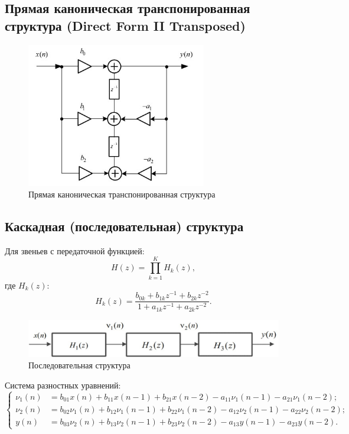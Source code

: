 \documentclass[a4paper, 14pt]{extarticle}
\begin{document}
\subsection{Прямая каноническая транспонированная структура (Direct Form II Transposed)}
\begin{figure}[h]
    \centering
    \includegraphics[width=0.7\textwidth]{img/S006.jpg}
    \caption{Прямая каноническая транспонированная структура}%
    \label{img:df2t}
\end{figure}
\FloatBarrier{}

\subsection{Каскадная (последовательная) структура}
Для звеньев с передаточной функцией:
\begin{equation}
    H(z) = \prod^K_{k=1} H_k (z),
\end{equation}
где $H_k(z)$:
\begin{equation}
    H_k(z) = \frac{b_{0k} + b_{1k} z^{-1} + b_{2k} z^{-2}}{1 + a_{1k} z^{-1} + a_{2k} z^{-2}}.
\end{equation}
\begin{figure}[h]
    \centering
    \includegraphics[width=\textwidth]{img/S007.jpg}
    \caption{Последовательная структура}%
    \label{img:cons}
\end{figure}

Система разностных уравнений:
\begin{equation}
    \begin{cases}
        \nu_1(n) &= b_{01} x(n) + b_{11} x(n-1) + b_{21} x(n-2) - a_{11} \nu_1(n-1) - a_{21} \nu_1(n-2);\\
        \nu_2(n) &= b_{02} \nu_1(n) + b_{12}\nu_1(n-1) + b_{22} \nu_1(n-2) - a_{12} \nu_2(n-1) - a_{22} \nu_2(n-2);\\
        y(n) &= b_{03} \nu_2(n) + b_{13} \nu_2(n-1) + b_{23} \nu_2 (n-2) - a_{13} y(n-1) - a_{23} y(n-2).
    \end{cases}
\end{equation}
\end{document}
